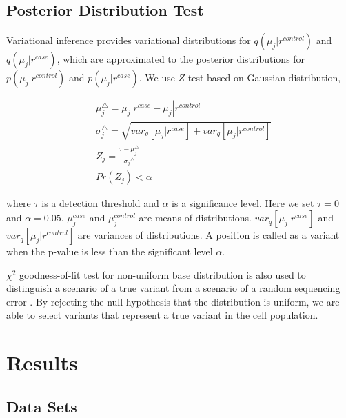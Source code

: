 \documentclass[11pt,reqno]{amsart}
\begin{document}
\subsection{Posterior Distribution Test}
Variational inference provides variational distributions for $q(\mu_j|r^{control})$ and $q(\mu_j|r^{case})$, which are approximated to the posterior distributions for $p(\mu_j|r^{control})$ and $p(\mu_j|r^{case})$.
We use $Z$-test based on Gaussian distribution,

\begin{align}
\label{eq:test}
& \mu_j^{\triangle} = \mu_j|r^{case}-\mu_j|r^{control}\\
& \sigma_j^{\triangle} = \sqrt {var_q{[\mu_j|r^{case}]} + var_q{[\mu_j|r^{control}]}}\\
& Z_j = \frac{\tau - \mu_j^{\triangle}}{{\sigma_j}^{\triangle}}\\
& Pr(Z_j) < \alpha
\end{align}

where $\tau$ is a detection threshold and $\alpha$ is a significance level. Here we set $\tau = 0$ and $\alpha = 0.05$.
$\mu_j^{case}$ and $\mu_j^{control}$ are means of distributions.
$var_q{[\mu_j|r^{case}]}$ and  $var_q{[\mu_j|r^{control}]}$ are variances of distributions.
A position is called as a variant when the p-value is less than the significant level $\alpha$.

$\chi^2$ goodness-of-fit test for non-uniform base distribution is also used to distinguish a scenario of a true variant from a scenario of a random sequencing error \citep{efron2010large, he2015rvd2}.
By rejecting the null hypothesis that the distribution is uniform, we are able to select variants that represent a true variant in the cell population.


\section{Results}

\subsection{Data Sets}
\end{document}

